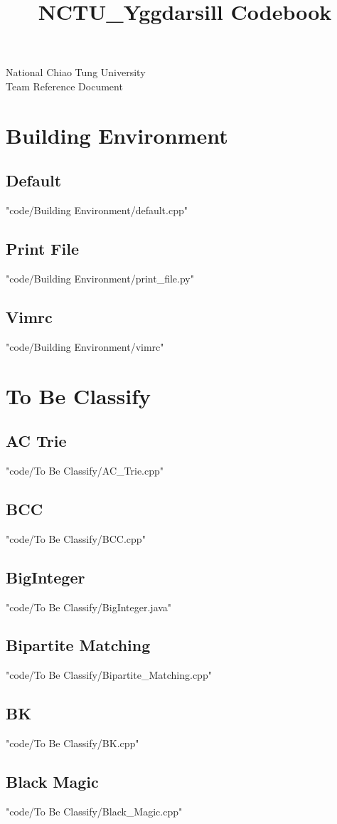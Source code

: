 \documentclass [landscape,8pt,a4paper,twocolumn]{article}
\title {NCTU\_Yggdarsill Codebook}
\begin{document}
\thispagestyle{fancy}
{ \Huge National Chiao Tung University \\ Team Reference Document}
\tableofcontents
\newpage

\section{Building Environment}
\subsection{Default}
 {"code/Building Environment/default.cpp"}
\subsection{Print File}
 {"code/Building Environment/print_file.py"}
\subsection{Vimrc}
 {"code/Building Environment/vimrc"}
\section{To Be Classify}
\subsection{AC Trie}
 {"code/To Be Classify/AC_Trie.cpp"}
\subsection{BCC}
 {"code/To Be Classify/BCC.cpp"}
\subsection{BigInteger}
 {"code/To Be Classify/BigInteger.java"}
\subsection{Bipartite Matching}
 {"code/To Be Classify/Bipartite_Matching.cpp"}
\subsection{BK}
 {"code/To Be Classify/BK.cpp"}
\subsection{Black Magic}
 {"code/To Be Classify/Black_Magic.cpp"}
\end{document}
